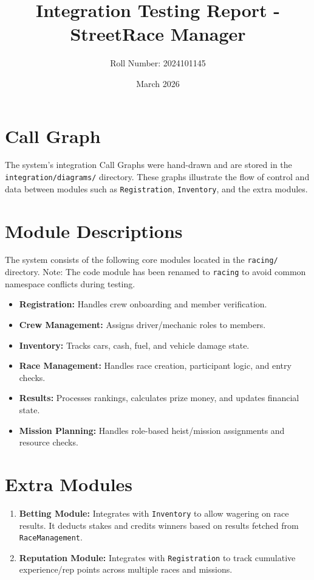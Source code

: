 \documentclass{article}
\title{Integration Testing Report - StreetRace Manager}
\author{Roll Number: 2024101145}
\date{March 2026}
\begin{document}
\maketitle

\section{Call Graph}
The system's integration Call Graphs were hand-drawn and are stored in the \texttt{integration/diagrams/} directory. These graphs illustrate the flow of control and data between modules such as \texttt{Registration}, \texttt{Inventory}, and the extra modules.

\section{Module Descriptions}
The system consists of the following core modules located in the \texttt{racing/} directory. Note: The code module has been renamed to \texttt{racing} to avoid common namespace conflicts during testing.
\begin{itemize}
    \item \textbf{Registration:} Handles crew onboarding and member verification.
    \item \textbf{Crew Management:} Assigns driver/mechanic roles to members.
    \item \textbf{Inventory:} Tracks cars, cash, fuel, and vehicle damage state.
    \item \textbf{Race Management:} Handles race creation, participant logic, and entry checks.
    \item \textbf{Results:} Processes rankings, calculates prize money, and updates financial state.
    \item \textbf{Mission Planning:} Handles role-based heist/mission assignments and resource checks.
\end{itemize}

\section{Extra Modules}
\begin{enumerate}
    \item \textbf{Betting Module:} Integrates with \texttt{Inventory} to allow wagering on race results. It deducts stakes and credits winners based on results fetched from \texttt{RaceManagement}.
    \item \textbf{Reputation Module:} Integrates with \texttt{Registration} to track cumulative experience/rep points across multiple races and missions.
\end{enumerate}
\end{document}
